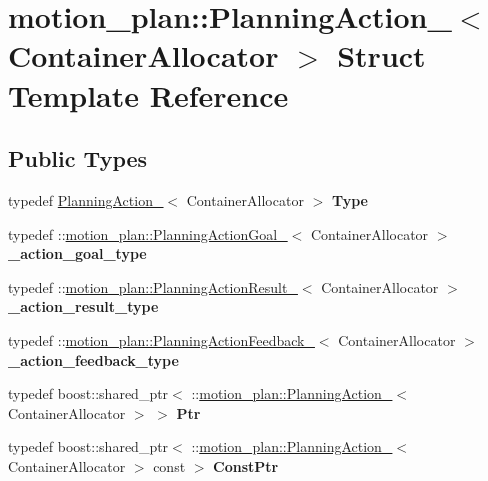\hypertarget{structmotion__plan_1_1PlanningAction__}{}\section{motion\+\_\+plan\+:\+:Planning\+Action\+\_\+$<$ Container\+Allocator $>$ Struct Template Reference}
\label{structmotion__plan_1_1PlanningAction__}
\subsection*{Public Types}
\begin{DoxyCompactItemize}
\item 
\mbox{\label{structmotion__plan_1_1PlanningAction___af610bde5ad4f3db771e173a72b490420}} 
typedef \hyperlink{structmotion__plan_1_1PlanningAction__}{Planning\+Action\+\_\+}$<$ Container\+Allocator $>$ {\bfseries Type}
\item 
\mbox{\label{structmotion__plan_1_1PlanningAction___ae56b001550566af4ca4cb50577b1d66f}} 
typedef \+::\hyperlink{structmotion__plan_1_1PlanningActionGoal__}{motion\+\_\+plan\+::\+Planning\+Action\+Goal\+\_\+}$<$ Container\+Allocator $>$ {\bfseries \+\_\+action\+\_\+goal\+\_\+type}
\item 
\mbox{\label{structmotion__plan_1_1PlanningAction___ac7407da9060243fc98e82d5a278335b9}} 
typedef \+::\hyperlink{structmotion__plan_1_1PlanningActionResult__}{motion\+\_\+plan\+::\+Planning\+Action\+Result\+\_\+}$<$ Container\+Allocator $>$ {\bfseries \+\_\+action\+\_\+result\+\_\+type}
\item 
\mbox{\label{structmotion__plan_1_1PlanningAction___ad3c5feb3e5b7a935a71a0b95639d712e}} 
typedef \+::\hyperlink{structmotion__plan_1_1PlanningActionFeedback__}{motion\+\_\+plan\+::\+Planning\+Action\+Feedback\+\_\+}$<$ Container\+Allocator $>$ {\bfseries \+\_\+action\+\_\+feedback\+\_\+type}
\item 
\mbox{\label{structmotion__plan_1_1PlanningAction___af9623b274b12f57440e150b8a0bbfccd}} 
typedef boost\+::shared\+\_\+ptr$<$ \+::\hyperlink{structmotion__plan_1_1PlanningAction__}{motion\+\_\+plan\+::\+Planning\+Action\+\_\+}$<$ Container\+Allocator $>$ $>$ {\bfseries Ptr}
\item 
\mbox{\label{structmotion__plan_1_1PlanningAction___a668dd672fbefaa4234248468db8fe118}} 
typedef boost\+::shared\+\_\+ptr$<$ \+::\hyperlink{structmotion__plan_1_1PlanningAction__}{motion\+\_\+plan\+::\+Planning\+Action\+\_\+}$<$ Container\+Allocator $>$ const  $>$ {\bfseries Const\+Ptr}
\end{DoxyCompactItemize}
